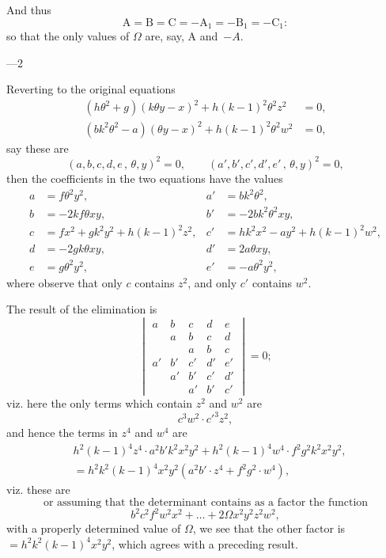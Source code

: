 \documentclass[11pt,a4paper]{book}
\providecommand{\between}{,}
\begin{document}
And thus
\[
\text{A} = \text{B} = \text{C} = -\text{A}_{1} = -\text{B}_{1} = -\text{C}_{1}:
\]
so that the only values of $\Omega$ are, say, A and~$-A$.

\medskip{}---2

\newpage
\setcounter{page}{112}

Reverting to the original equations
\begin{align*}
(h\theta^{2} + g)(k\theta y - x)^{2} + h(k-1)^{2}\theta^{2}z^{2} &= 0, \\
(bk^{2}\theta^{2} - a)(\theta y - x)^{2} + h(k-1)^{2}\theta^{2}w^{2} &= 0,
\end{align*}
say these are
\[
(a, b, c, d, e\,\!\!\between\,\theta, y)^{2} = 0, \qquad (a', b', c', d', e'\,\!\!\between\,\theta, y)^{2} = 0,
\]
then the coefficients in the two equations have the values
\begin{align*}
a &= f\theta^{2}y^{2}, & a' &= bk^{2}\theta^{2}, \\
b &= -2kf\theta xy, & b' &= -2bk^{2}\theta^{2}xy, \\
c &= fx^{2} + gk^{2}y^{2} + h(k-1)^{2}z^{2}, & c' &= hk^{2}x^{2} - ay^{2} + h(k-1)^{2}w^{2}, \\
d &= -2gk\theta xy, & d' &= 2a\theta xy, \\
e &= g\theta^{2}y^{2}, & e' &= -a\theta^{2}y^{2},
\end{align*}
where observe that only $c$ contains $z^{2}$, and only $c'$ contains $w^{2}$.

The result of the elimination is
\[
\begin{vmatrix}
a & b & c & d & e \\
  & a & b & c & d \\
  &   & a & b & c \\
a' & b' & c' & d' & e' \\
   & a' & b' & c' & d' \\
   &    & a' & b' & c'
\end{vmatrix}
= 0;
\]
viz. here the only terms which contain $z^{2}$ and $w^{2}$ are
\[
c^{3}w^{2} \cdot c'^{3}z^{2},
\]
and hence the terms in $z^{4}$ and $w^{4}$ are
\begin{align*}
&h^{2}(k-1)^{4}z^{4} \cdot a^{2}b'k^{2}x^{2}y^{2} + h^{2}(k-1)^{4}w^{4} \cdot f^{2}g^{2}k^{2}x^{2}y^{2}, \\
&= h^{2}k^{2}(k-1)^{4}x^{2}y^{2}(a^{2}b' \cdot z^{4} + f^{2}g^{2} \cdot w^{4}),
\end{align*}
viz. these are
\[
\text{or assuming that the determinant contains as a factor the function}
\]
\[
b^{2}c^{2}f^{2}w^{2}x^{2} + \ldots + 2\Omega x^{2}y^{2}z^{2}w^{2},
\]
with a properly determined value of $\Omega$, we see that the other factor is $= h^{2}k^{2}(k-1)^{4}x^{2}y^{2}$, which agrees with a preceding result.
\end{document}
